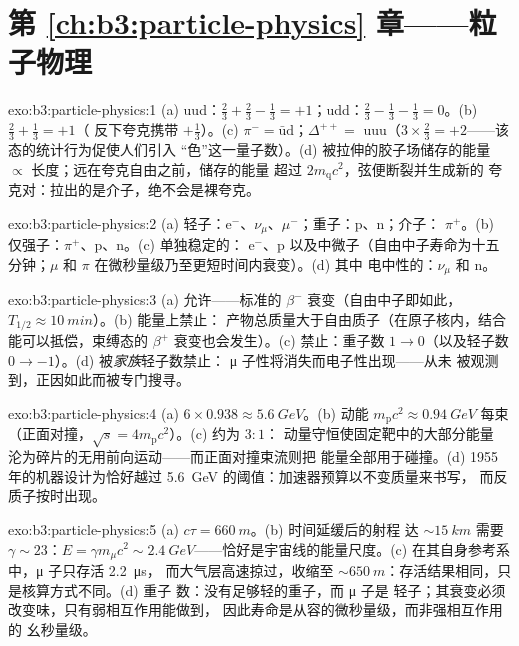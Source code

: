 \section*{第 \ref{ch:b3:particle-physics} 章——粒子物理}

\begin{solution}{exo:b3:particle-physics:1}
(a) uud：$\tfrac23 + \tfrac23 - \tfrac13 = +1$；udd：$\tfrac23 -
\tfrac13 - \tfrac13 = 0$。(b) $\tfrac23 + \tfrac13 = +1$（
反下夸克携带 $+\tfrac13$）。(c) $\pi^- =
\bar{\text{u}}\text{d}$；$\Delta^{++} = $ uuu（$3\times\tfrac23 =
+2$——该态的统计行为促使人们引入
“色”这一量子数）。(d) 被拉伸的胶子场储存的能量
$\propto$ 长度；远在夸克自由之前，储存的能量
超过 $2m_{\text{q}}c^2$，弦便断裂并生成新的
夸克对：拉出的是介子，绝不会是裸夸克。
\end{solution}

\begin{solution}{exo:b3:particle-physics:2}
(a) 轻子：e$^-$、$\nu_\mu$、$\mu^-$；重子：p、n；介子：
$\pi^+$。(b) 仅强子：$\pi^+$、p、n。(c) 单独稳定的：
e$^-$、p 以及中微子（自由中子寿命为十五
分钟；$\mu$ 和 $\pi$ 在微秒量级乃至更短时间内衰变）。(d) 其中
电中性的：$\nu_\mu$ 和 n。
\end{solution}

\begin{solution}{exo:b3:particle-physics:3}
(a) 允许——标准的 $\beta^-$ 衰变（自由中子即如此，
$T_{1/2} \approx \qty{10}{min}$）。(b) 能量上禁止：
产物总质量大于自由质子（在原子核内，结合
能可以抵偿，束缚态的 $\beta^+$ 衰变也会发生）。(c)
禁止：重子数 $1 \to 0$（以及轻子数
$0 \to -1$）。(d) 被\emph{家族}轻子数禁止：
μ 子性将消失而电子性出现——从未
被观测到，正因如此而被专门搜寻。
\end{solution}

\begin{solution}{exo:b3:particle-physics:4}
(a) $6\times0.938 \approx \qty{5.6}{GeV}$。(b) 动能
$m_{\text{p}}c^2 \approx \qty{0.94}{GeV}$ 每束
（正面对撞，$\sqrt s = 4m_{\text{p}}c^2$）。(c) 约为 $3:1$：
动量守恒使固定靶中的大部分能量
沦为碎片的无用前向运动——而正面对撞束流则把
能量全部用于碰撞。(d) 1955 年的机器设计为恰好越过
\qty{5.6}{GeV} 的阈值：加速器预算以不变质量来书写，
而反质子按时出现。
\end{solution}

\begin{solution}{exo:b3:particle-physics:5}
(a) $c\tau = \qty{660}{m}$。(b) 时间延缓后的射程
达 ${\sim}\qty{15}{km}$ 需要 $\gamma \sim 23$：$E = \gamma
m_\mu c^2 \sim \qty{2.4}{GeV}$——恰好是宇宙线的能量尺度。(c)
在其自身参考系中，μ 子只存活 \qty{2.2}{\micro s}，
而大气层高速掠过，收缩至
${\sim}\qty{650}{m}$：存活结果相同，只是核算方式不同。(d) 重子
数：没有足够轻的重子，而 μ 子是
轻子；其衰变必须改变味，只有弱相互作用能做到，
因此寿命是从容的微秒量级，而非强相互作用的
幺秒量级。
\end{solution}


